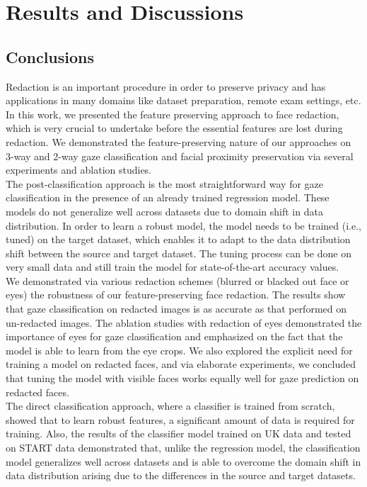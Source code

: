 \chapter{Results and Discussions}

\section{Conclusions}
Redaction is an important procedure in order to preserve privacy and has applications in many domains like dataset preparation, remote exam settings, etc. In this work, we presented the feature preserving approach to face redaction, which is very crucial to undertake before the essential features are lost during redaction. We demonstrated the feature-preserving nature of our approaches on 3-way and 2-way gaze classification and facial proximity preservation via several experiments and ablation studies. \\

The post-classification approach is the most straightforward way for gaze classification in the presence of an already trained regression model. These models do not generalize well across datasets due to domain shift in data distribution. In order to learn a robust model, the model needs to be trained (i.e., tuned) on the target dataset, which enables it to adapt to the data distribution shift between the source and target dataset. The tuning process can be done on very small data and still train the model for state-of-the-art accuracy values. \\

We demonstrated via various redaction schemes (blurred or blacked out face or eyes) the robustness of our feature-preserving face redaction. The results show that gaze classification on redacted images is as accurate as that performed on un-redacted images. The ablation studies with redaction of eyes demonstrated the importance of eyes for gaze classification and emphasized on the fact that the model is able to learn from the eye crops. We also explored the explicit need for training a model on redacted faces, and via elaborate experiments, we concluded that tuning the model with visible faces works equally well for gaze prediction on redacted faces. \\

The direct classification approach, where a classifier is trained from scratch, showed that to learn robust features, a significant amount of data is required for training. Also, the results of the classifier model trained on UK data and tested on START data demonstrated that, unlike the regression model, the classification model generalizes well across datasets and is able to overcome the domain shift in data distribution arising due to the differences in the source and target datasets.

